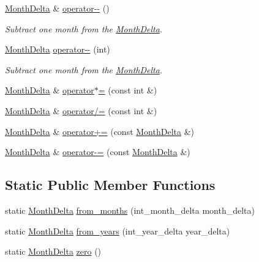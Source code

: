 \begin{DoxyCompactItemize}
\hyperlink{structMonthDelta}{\-Month\-Delta} \& \hyperlink{structMonthDelta_a792c4dd313efad2aec9dc80b7d18dc4e}{operator-\/-\/} ()
\begin{DoxyCompactList}\small\item\em \-Subtract one month from the \hyperlink{structMonthDelta}{\-Month\-Delta}. \end{DoxyCompactList}\item 
\hyperlink{structMonthDelta}{\-Month\-Delta} \hyperlink{structMonthDelta_a57b2bfc986e466491dc6ae5546988de7}{operator-\/-\/} (int)
\begin{DoxyCompactList}\small\item\em \-Subtract one month from the \hyperlink{structMonthDelta}{\-Month\-Delta}. \end{DoxyCompactList}\item 
\hyperlink{structMonthDelta}{\-Month\-Delta} \& \hyperlink{structMonthDelta_ad80b56e9007353c7e71f262fad0146a6}{operator$\ast$=} (const int \&)
\item 
\hyperlink{structMonthDelta}{\-Month\-Delta} \& \hyperlink{structMonthDelta_ae1aafe21948a9865384e4d1ef1786b27}{operator/=} (const int \&)
\item 
\hyperlink{structMonthDelta}{\-Month\-Delta} \& \hyperlink{structMonthDelta_a9b3e2752469f43e31bf71390149717ef}{operator+=} (const \hyperlink{structMonthDelta}{\-Month\-Delta} \&)
\item 
\hyperlink{structMonthDelta}{\-Month\-Delta} \& \hyperlink{structMonthDelta_aead99fd037d1a43ab477733c105d1d6e}{operator-\/=} (const \hyperlink{structMonthDelta}{\-Month\-Delta} \&)
\end{DoxyCompactItemize}
\subsection*{\-Static \-Public \-Member \-Functions}
\begin{DoxyCompactItemize}
\item 
static \hyperlink{structMonthDelta}{\-Month\-Delta} \hyperlink{structMonthDelta_afc96dd6ca914abc1ddd067f8f3755a89}{from\-\_\-months} (int\-\_\-month\-\_\-delta month\-\_\-delta)
\item 
static \hyperlink{structMonthDelta}{\-Month\-Delta} \hyperlink{structMonthDelta_a02632b6ef33850d9329bd04a686ce1ed}{from\-\_\-years} (int\-\_\-year\-\_\-delta year\-\_\-delta)
\item 
static \hyperlink{structMonthDelta}{\-Month\-Delta} \hyperlink{structMonthDelta_a847cb9c956c133957dbaffb32fb9bd15}{zero} ()
\end{DoxyCompactItemize}
